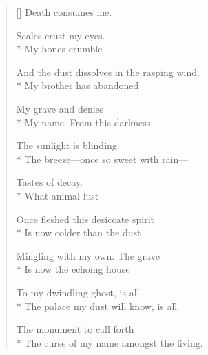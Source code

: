 \label{ch:lear_bq}
\settowidth{\versewidth}{And the dust dissolves in the rasping wind.}
\begin{verse}[\versewidth]
 Death consumes me.

Scales crust my eyes.\\*
My bones crumble

And the dust dissolves in the rasping wind.\\*
My brother has abandoned

My grave and denies\\*
My name. From this darkness

The sunlight is blinding.\\*
The breeze---once so sweet with rain---

Tastes of decay.\\*
\hspace*{2\vgap} What animal lust

Once fleshed this desiccate spirit\\*
Is now colder than the dust

Mingling with my own. \qquad The grave\\*
Is now the echoing house

To my dwindling ghost, is all\\*
The palace my dust will know, is all

The monument to call forth\\*
The curse of my name amongst the living.
\end{verse}
